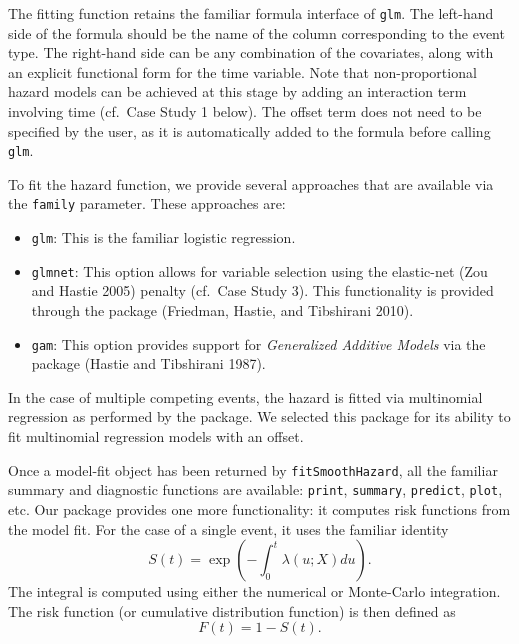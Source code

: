 The fitting function retains the familiar formula interface of \texttt{glm}. The left-hand side of the formula should be the name of the column corresponding to the event type. The right-hand side can be any combination of the covariates, along with an explicit functional form for the time variable. Note that non-proportional hazard models can be achieved at this stage by adding an interaction term involving time (cf.~Case Study 1 below). The offset term does not need to be specified by the user, as it is automatically added to the formula before calling \texttt{glm}.

To fit the hazard function, we provide several approaches that are available via the \texttt{family} parameter. These approaches are:

\begin{itemize}
\tightlist
\item
  \texttt{glm}: This is the familiar logistic regression.
\item
  \texttt{glmnet}: This option allows for variable selection using the elastic-net (Zou and Hastie 2005) penalty (cf.~Case Study 3). This functionality is provided through the  package (Friedman, Hastie, and Tibshirani 2010).
\item
  \texttt{gam}: This option provides support for \emph{Generalized Additive Models} via the  package (Hastie and Tibshirani 1987).
\end{itemize}

In the case of multiple competing events, the hazard is fitted via multinomial regression as performed by the  package. We selected this package for its ability to fit multinomial regression models with an offset.

Once a model-fit object has been returned by \texttt{fitSmoothHazard}, all the familiar summary and diagnostic functions are available: \texttt{print}, \texttt{summary}, \texttt{predict}, \texttt{plot}, etc. Our package provides one more functionality: it computes risk functions from the model fit. For the case of a single event, it uses the familiar identity
\begin{equation}
S(t) = \exp\left(-\int_0^t \lambda(u;X) du\right). 
\label{eq:surv}
\end{equation}
The integral is computed using either the numerical or Monte-Carlo integration. The risk function (or cumulative distribution function) is then defined as
\begin{equation}
F(t) = 1 - S(t). \label{eq:CDF}
\end{equation}


